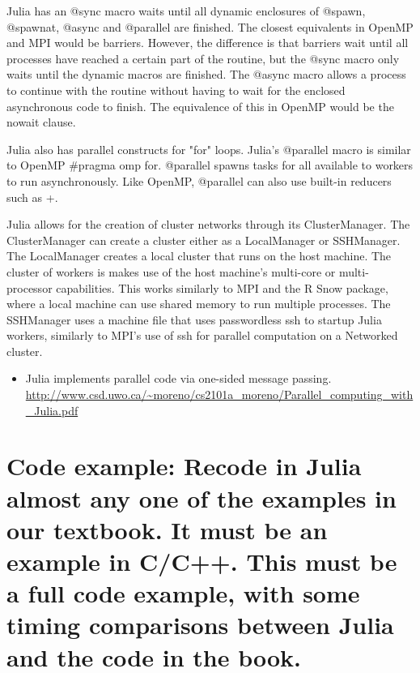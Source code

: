 \documentclass[10pt]{article}
\begin{document}
Julia has an @sync macro waits until all dynamic enclosures of @spawn, @spawnat, @async and @parallel are finished. The closest equivalents in OpenMP and MPI would be barriers. However, the difference is that barriers wait until all processes have reached a certain part of the routine, but the @sync macro only waits until the dynamic macros are finished. The @async macro allows a process to continue with the routine without having to wait for the enclosed asynchronous code to finish. The equivalence of this in OpenMP would be the nowait clause.

Julia also has parallel constructs for "for" loops. Julia's @parallel macro is similar to OpenMP \#pragma omp for. @parallel spawns tasks for all available to workers to run asynchronously. Like OpenMP, @parallel can also use built-in reducers such as +. 

Julia allows for the creation of cluster networks through its ClusterManager. The ClusterManager can create a cluster either as a LocalManager or SSHManager. The LocalManager creates a local cluster that runs on the host machine. The cluster of workers is makes use of the host machine’s multi-core or multi-processor capabilities. This works similarly to MPI and the R Snow package, where a local machine can use shared memory to run multiple processes. The SSHManager uses a machine file that uses passwordless ssh to startup Julia workers, similarly to MPI's use of ssh for parallel computation on a Networked cluster.

\begin{itemize}
\item Julia implements parallel code via one-sided message passing.
\url{http://www.csd.uwo.ca/~moreno/cs2101a_moreno/Parallel_computing_with_Julia.pdf}
\end{itemize}

\section*{\normalsize Code example: Recode in Julia almost any one of the examples in our textbook. It must be an example in C/C++. This must be a full code example, with some timing comparisons between Julia and the code in the book.}

\end{document}

